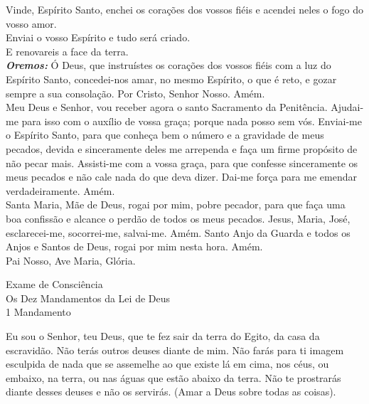 \documentclass{book}
\begin{document}
\begin{flushleft}
    Vinde, Espírito Santo, enchei os corações dos vossos fiéis e acendei neles o fogo do vosso amor. \\
    \VbarRed{} Enviai o vosso Espírito e tudo será criado. \\
    \RbarRed{} E renovareis a face da terra.
    \vspace{.2cm} \\
    \textbf{\textit{Oremos:}} Ó Deus, que instruístes os corações dos vossos fiéis com a luz do Espírito Santo, concedei-nos amar, no mesmo Espírito, o que é reto, e gozar sempre a sua consolação. Por Cristo, Senhor Nosso. Amém.
    \vspace{.2cm} \\
    Meu Deus e Senhor, vou receber agora o santo Sacramento da Penitência. Ajudai-me para isso com o auxílio de vossa graça; porque nada posso sem vós. Enviai-me o Espírito Santo, para que conheça bem o número e a gravidade de meus pecados, devida e sinceramente deles me arrependa e faça um firme propósito de não pecar mais. Assisti-me com a vossa graça, para que confesse sinceramente os meus pecados e não cale nada do que deva dizer. Dai-me força para me emendar verdadeiramente. Amém.
    \vspace{.2cm} \\
    Santa Maria, Mãe de Deus, rogai por mim, pobre pecador, para que faça uma boa confissão e alcance o perdão de todos os meus pecados. Jesus, Maria, José, esclarecei-me, socorrei-me, salvai-me. Amém. Santo Anjo da Guarda e todos os Anjos e Santos de Deus, rogai por mim nesta hora. Amém.
    \vspace{.2cm} \\
    Pai Nosso, Ave Maria, Glória.
\end{flushleft}
\newpage
\begin{center}
    Exame de Consciência \\
    \hfill{} \break{}
    \textcolor{VioletRed2}{Os Dez Mandamentos da Lei de Deus} \\
    \hfill{} \break{}
    1\textordmasculine{} Mandamento
\end{center}
\begin{flushleft}
    Eu sou o Senhor, teu Deus, que te fez sair da terra do Egito, da casa da escravidão. Não terás outros deuses diante de mim. Não farás para ti imagem esculpida de nada que se assemelhe ao que existe lá em cima, nos céus, ou embaixo, na terra, ou nas águas que estão abaixo da terra. Não te prostrarás diante desses deuses e não os servirás. (Amar a Deus sobre todas as coisas). \\
\end{flushleft}
\end{document}
